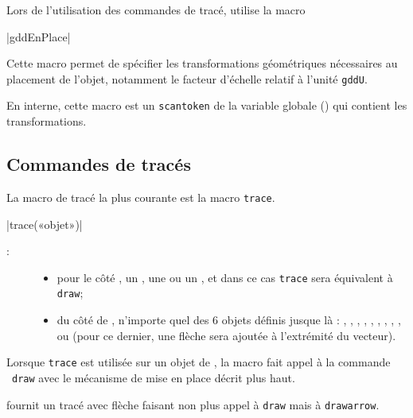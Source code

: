 \documentclass[a4paper,french]{article}
\begin{document}
Lors de l'utilisation des commandes de tracé, \mpgeomdd utilise la macro\label{gddEnPlace}
\begin{colourband}
\macro|gddEnPlace|
\end{colourband}
Cette macro permet de spécifier les transformations géométriques nécessaires au
placement de l'objet, notamment le facteur d'échelle relatif à l'unité
\lstinline+gddU+.

En interne, cette macro est un \lstinline+scantoken+ de la variable globale
 () qui contient les transformations. 

\subsection{Commandes de tracés}\label{sec:trace}

La macro de tracé la plus courante est la macro \lstinline+trace+.
\begin{colourband}
\macro|trace(«objet»)|
\begin{description}
  \item[:] 
  \begin{itemize}
    \item pour le côté \MP, un , une
   ou  un , et dans ce cas \lstinline+trace+ sera
  équivalent à \lstinline+draw+;
    \item du côté de \mpgeomdd,
  n'importe quel des 6 objets définis jusque là : ,
  , , , ,
  , ,
  , ,
   ou  (pour ce dernier, une flèche sera
  ajoutée à l'extrémité du vecteur).
  \end{itemize}
\end{description}
\end{colourband}

Lorsque \lstinline+trace+ est utilisée sur un objet de \mpgeomdd, la macro fait
appel à la commande \MP\ \lstinline+draw+ avec le mécanisme de mise en place
décrit plus haut.

\mpgeomdd fournit un tracé avec flèche faisant non plus appel à \lstinline+draw+
mais à \lstinline+drawarrow+.
\end{document}
